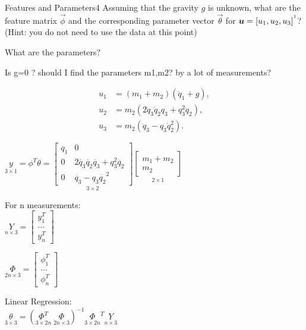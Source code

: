 \begin{questions}


\begin{question}{Features and Parameters}{4}
Assuming that the gravity $g$ is unknown, what are the feature matrix $\vec{\phi}$ and the corresponding parameter vector $\vec{\theta}$ for ${\boldsymbol{u}}=[u_{1},u_{2},u_{3}]^{^\mathsf{T}}$?
(Hint: you do not need to use the data at this point)

\begin{answer}
	
	What are the parameters?
	
	Is g=0 ? should I find the parameters m1,m2? by a lot of measurements?
	
		\begin{align*}
		u_{1} &= (m_{1}+m_{2})(\ddot{q}_{1}+g),\\
		u_{2} &= m_{2}(2\dot{q}_{3}\dot{q}_{2}q_{3}+q_{3}^{2}\ddot{q}_{2}),\\
		u_{3} &= m_{2}(\ddot{q}_{3}-q_{3}\dot{q}_{2}^{2}).
		\end{align*}
		
	$\underset{3\times 1} y= \phi^T \theta=  \underset{3\times 2} {\begin{bmatrix}
	\ddot{q_1}&0\\0&2\dot{q_3}\dot{q_2}\dot{q_3}+q_3^2\ddot{q_2}\\0&\ddot{q_3}-q_3 \dot{q_2}^2
	\end{bmatrix}}
	\underset{2\times 1}{\begin{bmatrix}
	m_1+m_2\\m_2
	\end{bmatrix}}$
	
	For n measurements: \\
	$\underset{n \times 3}Y=\begin{bmatrix}
	y_1^T\\...\\y_n^T
	\end{bmatrix}$
	
	$\underset{2n \times 3}\Phi=\begin{bmatrix}
	\phi_1^T\\...\\ \phi_n^T
	\end{bmatrix}$
	
	Linear Regression:\\
	$\underset{3 \times 3}\theta = ( \underset{3\times 2n}{\Phi^T} \; \underset{2n \times 3}{ \Phi})^{-1} \underset{3 \times 2n}\Phi^T \underset{n \times 3}{Y}$


\end{answer}
\end{question}
\end{questions}
